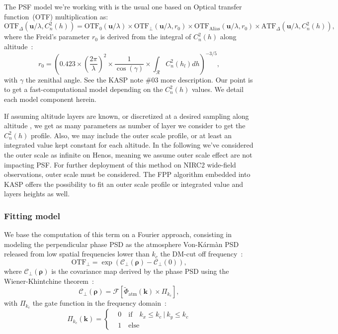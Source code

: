 \documentclass[12pt]{article}
\newcommand{\para}[1]{\left(#1\right)}
\newcommand{\cro}[1]{\left[#1\right]}
\newcommand{\rz}{r_0}
\newcommand{\cnh}{C_n^2(h)}
\newcommand{\cnhl}{C_n^2(h_l)}
\newcommand{\rhob}{\boldsymbol{\rho}}
\newcommand{\ubl}{\boldsymbol{u}/\lambda}
\newcommand{\otf}[1]{\text{OTF}_{#1}}
\newcommand{\atf}[1]{\text{ATF}_{#1}}
\begin{document}
The PSF model we're working with is the usual one based on Optical transfer function~(OTF) multiplication as:
\begin{equation}\label{E:model}
	\otf{\Delta}(\ubl,\cnh) = \otf{0}(\ubl) \times \otf{\perp}(\ubl,\rz) \times \otf{\text{Alias}}(\ubl,\rz) \times \atf{\Delta}(\ubl,\cnh),
\end{equation}
where the Freid's parameter $\rz$ is derived from the integral of $\cnh$ along altitude~:
\begin{equation}
	\rz = \para{0.423\times\para{\dfrac{2\pi}{\lambda}}^2\times\dfrac{1}{\cos{(\gamma)}}\times\int_{\mathcal{R}} \cnhl dh}^{-3/5},
\end{equation}
with $\gamma$ the zenithal angle. See the KASP note \#03 more description. Our point is to get a fast-computational model depending on the $\cnh$ values. We detail each model component herein. 

If assuming altitude layers are known, or discretized at a desired sampling along altitude , we get as many parameters as number of layer we consider to get the $\cnh$ profile. Also, we may include the outer scale profile, or at least an integrated value kept constant for each altitude. In the following we've considered the outer scale as infinite on Henos, meaning we assume outer scale effect are not impacting PSF. For further deployment of this method on NIRC2 wide-field observations, outer scale must be considered. The FPP algorithm embedded into KASP offers the possibility to fit an outer scale profile or integrated value and layers heights as well.

\subsubsection{Fitting model}
We base the computation of this term on a Fourier approach, consisting in modeling the perpendicular phase PSD as the atmosphere Von-K\'arm\`an PSD released from low spatial frequencies lower than $k_c$ the DM-cut off frequency~:
\begin{equation}
\otf{\perp} = \exp(\mathcal{C}_{\perp}(\rhob) - \mathcal{C}_{\perp}(0) ),
\end{equation}
where $	\mathcal{C}_{\perp}(\rhob)$ is the covariance map derived by the phase PSD using the Wiener-Khintchine theorem~:
\begin{equation}
\mathcal{C}_{\perp}(\rhob) = \mathcal{F}\cro{\tilde{\Phi}_\text{atm}(\boldsymbol{k})\times {\Pi}_{k_c} },
\end{equation}
with ${\Pi}_{k_c}$ the gate function in the frequency domain~:
\begin{equation}
{\Pi}_{k_c}(\boldsymbol{k}) = \left\lbrace 
\begin{aligned}
& 0\quad \text{if}\quad k_x \leq k_c \: | \: k_y \leq k_c\\
& 1\quad \text{else}
\end{aligned}
\right.
\end{equation}
\end{document}

